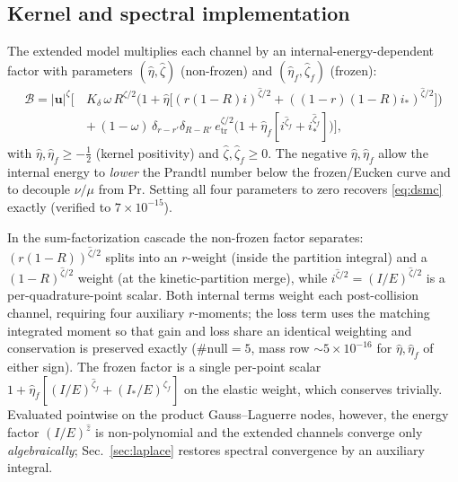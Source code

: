 \documentclass[11pt]{article}
\newcommand{\uu}{\mathbf{u}}
\newcommand{\etah}{\hat{\eta}}
\newcommand{\zetah}{\hat{\zeta}}
\renewcommand{\Pr}{\mathrm{Pr}}
\begin{document}
\subsection{Kernel and spectral implementation}
The extended model \cite[eq.~(43)]{Djordjic2023} multiplies each channel by an
internal-energy-dependent factor with parameters $(\etah,\zetah)$ (non-frozen) and
$(\etah_f,\zetah_f)$ (frozen):
\begin{equation}
\begin{aligned}
\mathcal{B}=|\uu|^\zeta\Big[\,
& K_\delta\,\omega\,R^{\zeta/2}\big(1+\etah\big[(r(1-R)i)^{\zetah/2}+((1-r)(1-R)i_*)^{\zetah/2}\big]\big) \\
& +\,(1-\omega)\,\delta_{r-r'}\delta_{R-R'}\,e_{\mathrm{tr}}^{\zeta/2}\big(1+\etah_f[i^{\zetah_f}+i_*^{\zetah_f}]\big)\Big],
\end{aligned}
\label{eq:ext}
\end{equation}
with $\etah,\etah_f\ge-\tfrac12$ (kernel positivity) and $\zetah,\zetah_f\ge0$. The negative
$\etah,\etah_f$ allow the internal energy to \emph{lower} the Prandtl number below the
frozen/Eucken curve and to decouple $\nu/\mu$ from $\Pr$. Setting all four parameters to zero
recovers \eqref{eq:dsmc} exactly (verified to $7\times10^{-15}$).

In the sum-factorization cascade the non-frozen factor separates: $(r(1-R))^{\zetah/2}$ splits
into an $r$-weight (inside the partition integral) and a $(1-R)^{\zetah/2}$ weight (at the
kinetic-partition merge), while $i^{\zetah/2}=(I/E)^{\zetah/2}$ is a per-quadrature-point scalar.
Both internal terms weight each post-collision channel, requiring four auxiliary $r$-moments;
the loss term uses the matching integrated moment so that gain and loss share an identical
weighting and conservation is preserved exactly ($\#\text{null}=5$, mass row $\sim5\times10^{-16}$
for $\etah,\etah_f$ of either sign). The frozen factor is a single per-point scalar
$1+\etah_f[(I/E)^{\zetah_f}+(I_*/E)^{\zetah_f}]$ on the elastic weight, which conserves trivially.
Evaluated pointwise on the product Gauss--Laguerre nodes, however, the energy factor
$(I/E)^{\hat z}$ is non-polynomial and the extended channels converge only \emph{algebraically};
Sec.~\ref{sec:laplace} restores spectral convergence by an auxiliary integral.
\end{document}
